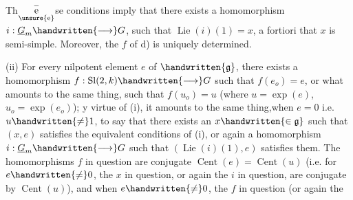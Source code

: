 Th$\overset{-}{\underset{\text{\unsure{e}}}{\text{e}}}$se conditions imply that there exists a homomorphism $i:\underline{G}_m\handwritten{\longrightarrow}G$, such that $\operatorname{Lie}(i)(1)=x$, a fortiori that $x$ is semi-simple. Moreover, the $f$ of d) is uniquely determined.

(ii) For every nilpotent element $e$ of $\handwritten{\mathfrak{g}}$, there exists a homomorphism $f:\operatorname{Sl}(2,k)\handwritten{\longrightarrow}G$ such that $f(e_o)=e$, or what amounts to the same thing, such that $f(u_o)=u$ (where $u=\exp(e)$, $u_o=\exp(e_o)$); y virtue of (i), it amounts to the same thing,\deleted{\unsure{(}}when $e=0$ i\handwritten{/}.e. $u\handwritten{\ne}1$, to say that there exists an $x\handwritten{\in\mathfrak{g}}$ such that $(x,e)$ satisfies the equivalent conditions of (i), or again a homomorphism $i:\underline{G}_m\handwritten{\longrightarrow}G$ such that $(\operatorname{Lie}(i)(1),e)$ satisfies them. The homomorphisms $f$ in question are conjugate $\operatorname{Cent}(e)=\operatorname{Cent}(u)$ (i.e. for $e\handwritten{\ne}0$, the $x$ in question, or again the $i$ in question, are conjugate  by $\operatorname{Cent}(u)$), and when $e\handwritten{\ne}0$, the  $f$ in question (or again the
